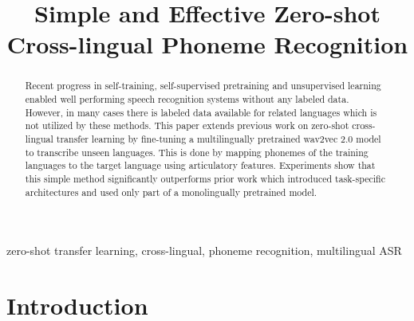 \documentclass{article}
\title{Simple and Effective Zero-shot Cross-lingual Phoneme Recognition}
\begin{document}
%
\maketitle
%
\begin{abstract}
Recent progress in self-training, self-supervised pretraining and unsupervised learning enabled well performing speech recognition systems without any labeled data.
However, in many cases there is labeled data available for related languages which is not utilized by these methods.
This paper extends previous work on zero-shot cross-lingual transfer learning by fine-tuning a multilingually pretrained wav2vec 2.0 model to transcribe unseen languages.
This is done by mapping phonemes of the training languages to the target language using articulatory features.
Experiments show that this simple method significantly outperforms prior work which introduced task-specific architectures and used only part of a monolingually pretrained model.
\end{abstract}
%
\begin{keywords}
zero-shot transfer learning, cross-lingual, phoneme recognition, multilingual ASR

\end{keywords}
%
\section{Introduction}
\label{sec:intro}
\end{document}
